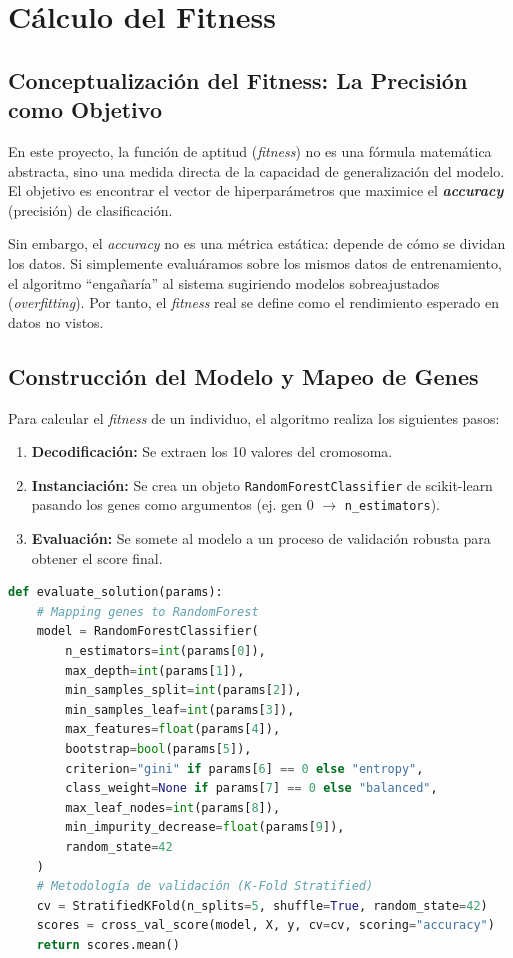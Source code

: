 \documentclass[12pt, a4paper]{article}
\begin{document}
\section{Cálculo del Fitness}

\subsection{Conceptualización del Fitness: La Precisión como Objetivo}

En este proyecto, la función de aptitud (\textit{fitness}) no es una fórmula matemática
abstracta, sino una medida directa de la capacidad de generalización del modelo. El objetivo
es encontrar el vector de hiperparámetros que maximice el \textbf{\textit{accuracy}} (precisión)
de clasificación.

Sin embargo, el \textit{accuracy} no es una métrica estática: depende de cómo se dividan
los datos. Si simplemente evaluáramos sobre los mismos datos de entrenamiento, el
algoritmo ``engañaría'' al sistema sugiriendo modelos sobreajustados (\textit{overfitting}).
Por tanto, el \textit{fitness} real se define como el rendimiento esperado en datos
no vistos.

\subsection{Construcción del Modelo y Mapeo de Genes}

Para calcular el \textit{fitness} de un individuo, el algoritmo realiza los siguientes
pasos:
\begin{enumerate}[itemsep=0.2em]
  \item \textbf{Decodificación:} Se extraen los 10 valores del cromosoma.
  \item \textbf{Instanciación:} Se crea un objeto \texttt{RandomForestClassifier} de scikit-learn
        pasando los genes como argumentos (ej. gen 0 $\to$ \texttt{n\_estimators}).
  \item \textbf{Evaluación:} Se somete al modelo a un proceso de validación robusta para
        obtener el score final.
\end{enumerate}

\begin{lstlisting}[language=Python, caption={Cálculo del fitness mediante evaluación de modelo}]
def evaluate_solution(params):
    # Mapping genes to RandomForest
    model = RandomForestClassifier(
        n_estimators=int(params[0]),
        max_depth=int(params[1]),
        min_samples_split=int(params[2]),
        min_samples_leaf=int(params[3]),
        max_features=float(params[4]),
        bootstrap=bool(params[5]),
        criterion="gini" if params[6] == 0 else "entropy",
        class_weight=None if params[7] == 0 else "balanced",
        max_leaf_nodes=int(params[8]),
        min_impurity_decrease=float(params[9]),
        random_state=42
    )
    # Metodología de validación (K-Fold Stratified)
    cv = StratifiedKFold(n_splits=5, shuffle=True, random_state=42)
    scores = cross_val_score(model, X, y, cv=cv, scoring="accuracy")
    return scores.mean()
\end{lstlisting}
\end{document}

